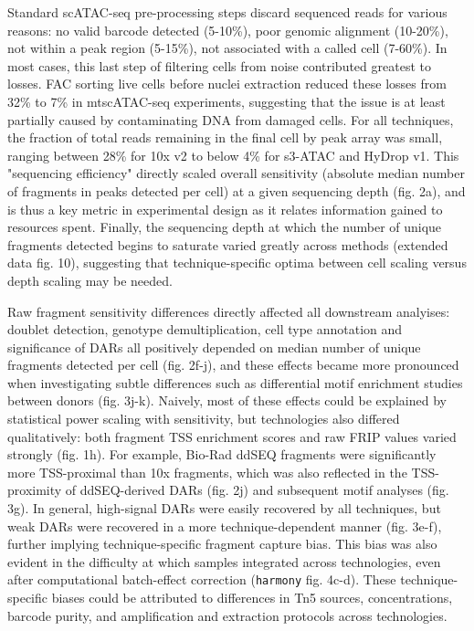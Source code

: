 Standard scATAC-seq pre-processing steps discard sequenced reads for various reasons: no valid barcode detected (5-10\%), poor genomic alignment (10-20\%), not within a peak region (5-15\%), not associated with a called cell (7-60\%). In most cases, this last step of filtering cells from noise contributed greatest to losses. FAC sorting live cells before nuclei extraction reduced these losses from 32\% to 7\% in mtscATAC-seq experiments, suggesting that the issue is at least partially caused by contaminating DNA from damaged cells. For all techniques, the fraction of total reads remaining in the final cell by peak array was small, ranging between \num{28}\% for 10x v2 to below \num{4}\% for s3-ATAC and HyDrop v1. This "sequencing efficiency" directly scaled overall sensitivity (absolute median number of fragments in peaks detected per cell) at a given sequencing depth (fig. 2a), and is thus a key metric in experimental design as it relates information gained to resources spent. Finally, the sequencing depth at which the number of unique fragments detected begins to saturate varied greatly across methods (extended data fig. 10), suggesting that technique-specific optima between cell scaling versus depth scaling may be needed.

Raw fragment sensitivity differences directly affected all downstream analyises: doublet detection, genotype demultiplication, cell type annotation and significance of DARs all positively depended on median number of unique fragments detected per cell (fig. 2f-j), and these effects became more pronounced when investigating subtle differences such as differential motif enrichment studies between donors (fig. 3j-k). Naively, most of these effects could be explained by statistical power scaling with sensitivity, but technologies also differed qualitatively: both fragment TSS enrichment scores and raw FRIP values varied strongly (fig. 1h). For example, Bio-Rad ddSEQ fragments were significantly more TSS-proximal than 10x fragments, which was also reflected in the TSS-proximity of ddSEQ-derived DARs (fig. 2j) and subsequent motif analyses (fig. 3g). In general, high-signal DARs were easily recovered by all techniques, but weak DARs were recovered in a more technique-dependent manner (fig. 3e-f), further implying technique-specific fragment capture bias. This bias was also evident in the difficulty at which samples integrated across technologies, even after computational batch-effect correction (\verb|harmony| fig. 4c-d). These technique-specific biases could be attributed to differences in Tn5 sources, concentrations, barcode purity, and amplification and extraction protocols across technologies.